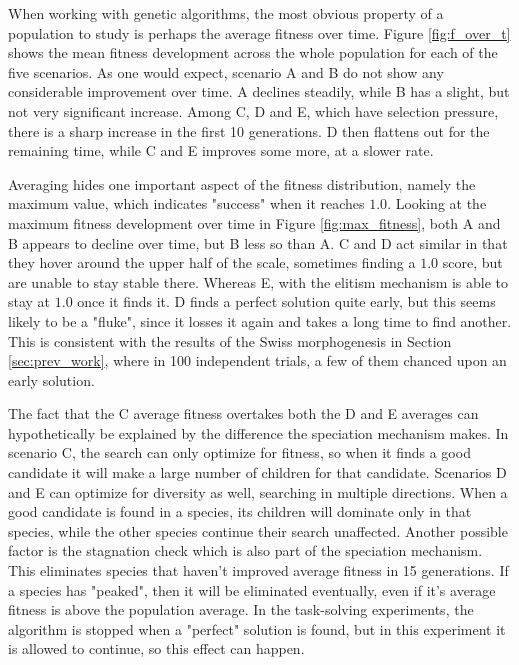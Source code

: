 When working with genetic algorithms, the most obvious property of a population to study is perhaps the average fitness over time.
Figure \ref{fig:f_over_t} shows the mean fitness development across the whole population for each of the five scenarios.
As one would expect, scenario A and B do not show any considerable improvement over time.
A declines steadily, while B has a slight, but not very significant increase.
Among C, D and E, which have selection pressure, there is a sharp increase in the first 10 generations.
D then flattens out for the remaining time, while C and E improves some more, at a slower rate.

Averaging hides one important aspect of the fitness distribution, namely the maximum value, which indicates "success" when it reaches $1.0$.
Looking at the maximum fitness development over time in Figure \ref{fig:max_fitness},
both A and B appears to decline over time, but B less so than A.
C and D act similar in that they hover around the upper half of the scale, sometimes finding a $1.0$ score, but are unable to stay stable there.
Whereas E, with the elitism mechanism is able to stay at $1.0$ once it finds it.
D finds a perfect solution quite early, but this seems likely to be a "fluke", since it losses it again and takes a long time to find another.
This is consistent with the results of the Swiss morphogenesis in Section \ref{sec:prev_work}, where in 100 independent trials, a few of them chanced upon an early solution.

The fact that the C average fitness overtakes both the D and E averages can hypothetically be explained by the difference the speciation mechanism makes.
In scenario C, the search can only optimize for fitness, so when it finds a good candidate it will make a large number of children for that candidate.
Scenarios D and E can optimize for diversity as well, searching in multiple directions.
When a good candidate is found in a species, its children will dominate only in that species,
while the other species continue their search unaffected.
Another possible factor is the stagnation check which is also part of the speciation mechanism.
This eliminates species that haven't improved average fitness in 15 generations.
If a species has "peaked", then it will be eliminated eventually, even if it's average fitness is above the population average.
In the task-solving experiments, the algorithm is stopped when a "perfect" solution is found, but in this experiment it is allowed to continue, so this effect can happen.

